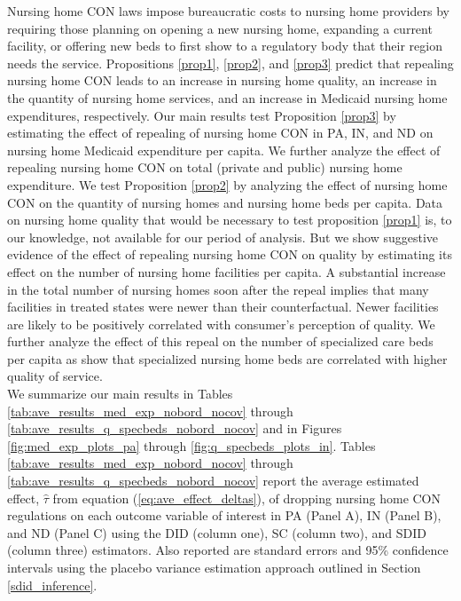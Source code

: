 \documentclass[../Main.tex]{subfiles}
\begin{document}
Nursing home CON laws impose bureaucratic costs to nursing home providers by requiring those planning on opening a new nursing home, expanding a current facility, or offering new beds to first show to a regulatory body that their region needs the service. Propositions \ref{prop1}, \ref{prop2}, and \ref{prop3} predict that repealing nursing home CON leads to an increase in nursing home quality, an increase in the quantity of nursing home services, and an increase in Medicaid nursing home expenditures, respectively. Our main results test Proposition \ref{prop3} by estimating the effect of repealing of nursing home CON in PA, IN, and ND on nursing home Medicaid expenditure per capita. We further analyze the effect of repealing nursing home CON on total (private and public) nursing home expenditure. We test Proposition \ref{prop2} by analyzing the effect of nursing home CON on the quantity of nursing homes and nursing home beds per capita. Data on nursing home quality that would be necessary to test proposition \ref{prop1} is, to our knowledge, not available for our period of analysis. But we show suggestive evidence of the effect of repealing nursing home CON on quality by estimating its effect on the number of nursing home facilities per capita. A substantial increase in the total number of nursing homes soon after the repeal implies that many facilities in treated states were newer than their counterfactual. Newer facilities are likely to be positively correlated with consumer's perception of quality. We further analyze the effect of this repeal on the number of specialized care beds per capita as \citet{grabowski2010quality} show that specialized nursing home beds are correlated with higher quality of service.\\
\indent We summarize our main results in Tables \ref{tab:ave_results_med_exp_nobord_nocov} through \ref{tab:ave_results_q_specbeds_nobord_nocov} and in Figures \ref{fig:med_exp_plots_pa} through \ref{fig:q_specbeds_plots_in}. Tables \ref{tab:ave_results_med_exp_nobord_nocov} through \ref{tab:ave_results_q_specbeds_nobord_nocov} report the average estimated effect, $\hat{\tau}$ from equation (\ref{eq:ave_effect_deltas}), of dropping nursing home CON regulations on each outcome variable of interest in PA (Panel A), IN (Panel B), and ND (Panel C) using the DID (column one), SC (column two), and SDID (column three) estimators. Also reported are standard errors and 95\% confidence intervals using the placebo variance estimation approach outlined in Section \ref{sdid_inference}.\\
\end{document}
